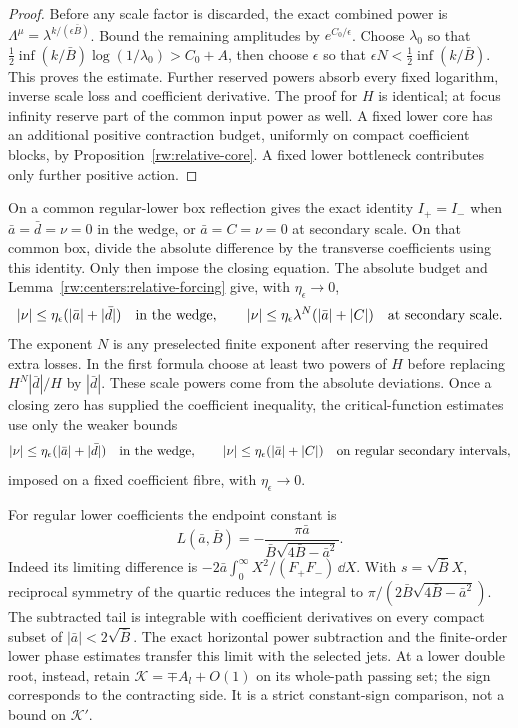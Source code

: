\begin{proof}
Before any scale factor is discarded, the exact combined power is
$\Lambda^\mu=\lambda^{k/(\epsilon\bar B)}$.
Bound the remaining amplitudes by $e^{C_0/\epsilon}$.
Choose $\lambda_0$ so that
$\frac12\inf(k/\bar B)\log(1/\lambda_0)>C_0+A$,
then choose $\epsilon$ so that
$\epsilon N<\frac12\inf(k/\bar B)$.
This proves the estimate. Further reserved powers absorb every
fixed logarithm, inverse scale loss and coefficient derivative.
The proof for $H$ is identical; at focus infinity reserve part
of the common input power as well. A fixed lower core has an
additional positive contraction budget, uniformly on compact
coefficient blocks, by Proposition~\ref{rw:relative-core}.
A fixed lower bottleneck contributes only further positive action.
\end{proof}

On a common regular-lower box reflection gives the exact identity
$I_+=I_-$ when $\bar a=\bar d=\nu=0$ in the wedge, or
$\bar a=C=\nu=0$ at secondary scale.
On that common box, divide the absolute difference by the transverse
coefficients using this identity. Only then impose the closing equation.
The absolute budget and Lemma~\ref{rw:centers:relative-forcing} give,
with $\eta_\epsilon\to0$,
\begin{equation}\label{rw:secondary:local-forcing}
 |\nu|\le\eta_\epsilon(|\bar a|+|\bar d|)
 \quad\hbox{in the wedge},\qquad
 |\nu|\le\eta_\epsilon\lambda^N(|\bar a|+|C|)
 \quad\hbox{at secondary scale}.
\end{equation}
The exponent $N$ is any preselected finite exponent after reserving
the required extra losses. In the first formula choose at least two
powers of $H$ before replacing $H^N|\bar d|/H$ by $|\bar d|$.
These scale powers come from the absolute deviations. Once a closing
zero has supplied the coefficient inequality, the critical-function
estimates use only the weaker bounds
\begin{equation}\label{rw:secondary:critical-forcing}
 |\nu|\le\eta_\epsilon(|\bar a|+|\bar d|)
 \quad\hbox{in the wedge},\qquad
 |\nu|\le\eta_\epsilon(|\bar a|+|C|)
 \quad\hbox{on regular secondary intervals},
\end{equation}
imposed on a fixed coefficient fibre, with $\eta_\epsilon\to0$.

For regular lower coefficients the endpoint constant is
\begin{equation}\label{rw:secondary:lower-constant}
 L(\bar a,\bar B)=
 -\frac{\pi\bar a}{\bar B\sqrt{4\bar B-\bar a^2}} .
\end{equation}
Indeed its limiting difference is
$-2\bar a\int_0^\infty X^2/(F_+F_-)\,\dd X$.
With $s=\sqrt{\bar B}X$, reciprocal symmetry of the quartic
reduces the integral to
$\pi/(2\bar B\sqrt{4\bar B-\bar a^2})$.
The subtracted tail is integrable with coefficient derivatives on
every compact subset of $|\bar a|<2\sqrt{\bar B}$.
The exact horizontal power subtraction and the finite-order lower
phase estimates transfer this limit with the selected jets.
At a lower double root, instead, retain
$\mathcal K=\mp A_l+O(1)$ on its whole-path passing set;
the sign corresponds to the contracting side. It is a strict
constant-sign comparison, not a bound on $\mathcal K'$.


